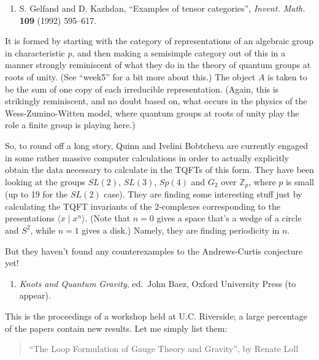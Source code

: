 \documentclass{article}
\def\tightlist{}
\begin{document}
\begin{enumerate}
\def\labelenumi{\arabic{enumi})}
\setcounter{enumi}{4}
\tightlist
\item
  S. Gelfand and D. Kazhdan, ``Examples of tensor categories'',
  \emph{Invent. Math.} \textbf{109} (1992) 595--617.
\end{enumerate}

It is formed by starting with the category of representations of an
algebraic group in characteristic \(p\), and then making a semisimple
category out of this in a manner strongly reminiscent of what they do in
the theory of quantum groups at roots of unity. (See ``week5'' for a bit
more about this.) The object \(A\) is taken to be the sum of one copy of
each irreducible representation. (Again, this is strikingly reminiscent,
and no doubt based on, what occurs in the physics of the
Wess-Zumino-Witten model, where quantum groups at roots of unity play
the role a finite group is playing here.)

So, to round off a long story, Quinn and Ivelini Bobtcheva are currently
engaged in some rather massive computer calculations in order to
actually explicitly obtain the data necessary to calculate in the TQFTs
of this form. They have been looking at the groups \(SL(2)\), \(SL(3)\),
\(Sp(4)\) and \(G_2\) over \(\mathbb{Z}_p\), where \(p\) is small (up to
19 for the \(SL(2)\) case). They are finding some interesting stuff just
by calculating the TQFT invariants of the 2-complexes corresponding to
the presentations \(\langle x \mid x^n \rangle\). (Note that \(n = 0\)
gives a space that's a wedge of a circle and \(S^2\), while \(n = 1\)
gives a disk.) Namely, they are finding periodicity in \(n\).

But they haven't found any counterexamples to the Andrews-Curtis
conjecture yet!

\begin{enumerate}
\def\labelenumi{\arabic{enumi})}
\setcounter{enumi}{5}
\tightlist
\item
  \emph{Knots and Quantum Gravity}, ed.~John Baez, Oxford University
  Press (to appear).
\end{enumerate}

This is the proceedings of a workshop held at U.C. Riverside; a large
percentage of the papers contain new results. Let me simply list them:

\begin{quote}
``The Loop Formulation of Gauge Theory and Gravity'', by Renate Loll
\end{quote}
\end{document}
